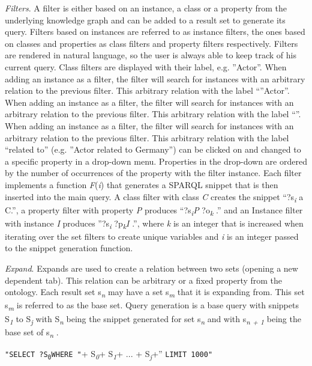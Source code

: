 \documentclass{sig-alternate}
\begin{document}
{\em Filters}. A filter is either based on an instance, a class or a property from the underlying knowledge graph and can be added to a result set to generate its query. Filters based on instances are referred to as instance filters, the ones based on classes and properties as class filters and property filters respectively. Filters are rendered in natural language, so the user is always able to keep track of his current query. Class ﬁlters are displayed with their label, e.g. ''Actor''. When adding an instance as a ﬁlter, the ﬁlter will search for instances with an arbitrary relation to the previous ﬁlter. This arbitrary relation with the label ``''Actor''. When adding an instance as a ﬁlter, the ﬁlter will search for instances with an arbitrary relation to the previous ﬁlter. This arbitrary relation with the label ``''. When adding an instance as a ﬁlter, the ﬁlter will search for instances with an arbitrary relation to the previous ﬁlter. This arbitrary relation with the label ``related to'' (e.g. ''Actor related to Germany'') can be clicked on and changed to a speciﬁc property in a drop-down menu. Properties in the drop-down are ordered by the number of occurrences of the property with the ﬁlter instance. Each ﬁlter implements a function {\em F}({\em i}) that generates a SPARQL snippet that is then inserted into the main query. A class ﬁlter with class {\em C} creates the snippet ``?s\textsubscript{{\em i}} a C.'', a property ﬁlter with property {\em P} produces ``?s\textsubscript{{\em i}}{\em P} ?o\textsubscript{{\em k}} .'' and an Instance ﬁlter with instance {\em I} produces ''?s\textsubscript{{\em i}} ?p\textsubscript{{\em k}}{\em I} .'', where {\em k} is an integer that is increased when iterating over the set ﬁlters to create unique variables and {\em i} is an integer passed to the snippet generation function.

{\em Expand}. Expands are used to create a relation between two sets (opening a new dependent tab). This relation can be arbitrary or a ﬁxed property from the ontology. Each result set s\textsubscript{{\em n}} may have a set s\textsubscript{{\em m}} that it is expanding from. This set s\textsubscript{{\em m}} is referred to as the base set. Query generation is a base query with snippets S\textsubscript{{\em 1}} to S\textsubscript{{\em j}} with S\textsubscript{{\em n}} being the snippet generated for set s\textsubscript{{\em n}} and with s\textsubscript{{\em n + 1}} being the base set of s\textsubscript{{\em n}} .

\Verb+"SELECT ?S+\textsubscript{\Verb+0+}\Verb+WHERE "++ S\textsubscript{{\em 0}}\textsubscript{}+ S\textsubscript{{\em 1}}\textsubscript{}+ ... + S\textsubscript{{\em j}}\textsubscript{}+\Verb++'' \Verb+LIMIT 1000"+
\end{document}
